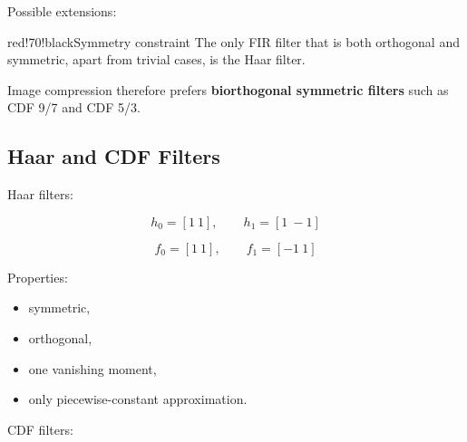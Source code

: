 Possible extensions:

\begin{center}
\end{center}

\begin{calloutbox}{red!70!black}{Symmetry constraint}
The only FIR filter that is both orthogonal and symmetric, apart from trivial cases, is the Haar filter.

Image compression therefore prefers \textbf{biorthogonal symmetric filters} such as CDF 9/7 and CDF 5/3.
\end{calloutbox}

\subsection{Haar and CDF Filters}

Haar filters:

\[
h_0=[1\ 1],\qquad h_1=[1\ -1]
\]

\[
f_0=[1\ 1],\qquad f_1=[-1\ 1]
\]

Properties:

\begin{itemize}
  \item symmetric,
  \item orthogonal,
  \item one vanishing moment,
  \item only piecewise-constant approximation.
\end{itemize}

CDF filters:

\begin{center}
\end{center}

